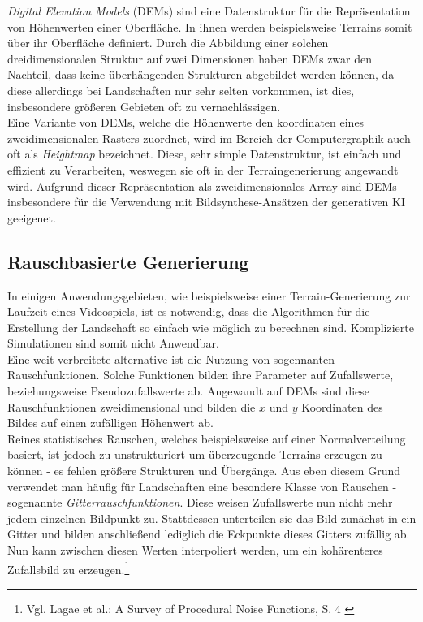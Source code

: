 \textit{Digital Elevation Models} (DEMs) sind eine Datenstruktur für die Repräsentation von Höhenwerten einer Oberfläche. In ihnen werden beispielsweise Terrains somit über ihr Oberfläche definiert. Durch die Abbildung einer solchen dreidimensionalen Struktur auf zwei Dimensionen haben DEMs zwar den Nachteil, dass keine überhängenden Strukturen abgebildet werden können, da diese allerdings bei Landschaften nur sehr selten vorkommen, ist dies, insbesondere größeren Gebieten oft zu vernachlässigen.\\
Eine Variante von DEMs, welche die Höhenwerte den koordinaten eines zweidimensionalen Rasters zuordnet, wird im Bereich der Computergraphik auch oft als \textit{Heightmap} bezeichnet. Diese, sehr simple Datenstruktur, ist einfach und effizient zu Verarbeiten, weswegen sie oft in der Terraingenerierung angewandt wird. Aufgrund dieser Repräsentation als zweidimensionales Array sind DEMs insbesondere für die Verwendung mit Bildsynthese-Ansätzen der generativen KI geeigenet.

\subsection{Rauschbasierte Generierung}

In einigen Anwendungsgebieten, wie beispielsweise einer Terrain-Generierung zur Laufzeit eines Videospiels, ist es notwendig, dass die Algorithmen für die Erstellung der Landschaft so einfach wie möglich zu berechnen sind. Komplizierte Simulationen sind somit nicht Anwendbar. \\ 
Eine weit verbreitete alternative ist die Nutzung von sogennanten Rauschfunktionen. Solche Funktionen bilden ihre Parameter auf Zufallswerte, beziehungsweise Pseudozufallswerte ab. Angewandt auf DEMs sind diese Rauschfunktionen zweidimensional und bilden die $x$ und $y$ Koordinaten des Bildes auf einen zufälligen Höhenwert ab. \\ 
Reines statistisches Rauschen, welches beispielsweise auf einer Normalverteilung basiert, ist jedoch zu unstrukturiert um überzeugende Terrains erzeugen zu können - es fehlen größere Strukturen und Übergänge. Aus eben diesem Grund verwendet man häufig für Landschaften eine besondere Klasse von Rauschen - sogenannte \textit{Gitterrauschfunktionen}. Diese weisen Zufallswerte nun nicht mehr jedem einzelnen Bildpunkt zu. Stattdessen unterteilen sie das Bild zunächst in ein Gitter und bilden anschließend lediglich die Eckpunkte dieses Gitters zufällig ab. Nun kann zwischen diesen Werten interpoliert werden, um ein kohärenteres Zufallsbild zu erzeugen.\footnote{
    Vgl. Lagae et al.: A Survey of Procedural Noise Functions, S. 4
    \cite{https://doi.org/10.1111/j.1467-8659.2010.01827.x}
}  

